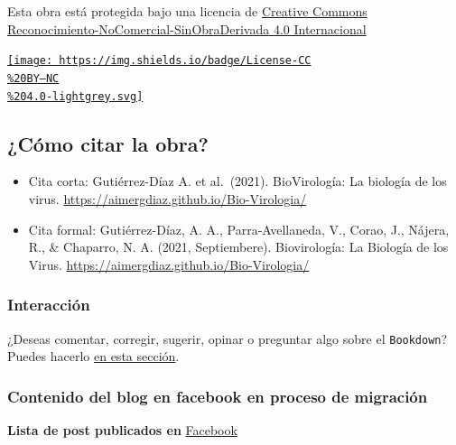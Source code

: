 \documentclass[
  12pt, krantz2,
  spanish,
]{krantz}
\begin{document}
Esta obra está protegida bajo una licencia de \href{https://creativecommons.org/licenses/by-nc-nd/4.0/deed.es_ES}{Creative Commons Reconocimiento-NoComercial-SinObraDerivada 4.0 Internacional}

\href{https://creativecommons.org/licenses/by-nc/4.0/}{\texttt{[image: https://img.shields.io/badge/License-CC\\\%20BY--NC\\\%204.0-lightgrey.svg]}}

\hypertarget{cuxf3mo-citar-la-obra}{%
\subsection*{¿Cómo citar la obra?}\label{cuxf3mo-citar-la-obra}}

\begin{itemize}
\item
  Cita corta:
  Gutiérrez-Díaz A. et al.~(2021). BioVirología: La biología de los virus. \url{https://aimergdiaz.github.io/Bio-Virologia/}
\item
  Cita formal:
  Gutiérrez-Díaz, A. A., Parra-Avellaneda, V., Corao, J., Nájera, R., \& Chaparro, N. A. (2021, Septiembere). Biovirología: La Biología de los Virus. \url{https://aimergdiaz.github.io/Bio-Virologia/}
\end{itemize}

\hypertarget{interacciuxf3n}{%
\subsubsection*{Interacción}\label{interacciuxf3n}}

¿Deseas comentar, corregir, sugerir, opinar o preguntar algo sobre el \texttt{Bookdown}? Puedes hacerlo \href{https://github.com/AimerGDiaz/Bio-Virologia/discussions/10}{en esta sección}.

\hypertarget{contenido-del-blog-en-facebook-en-proceso-de-migraciuxf3n}{%
\subsubsection*{Contenido del blog en facebook en proceso de migración}\label{contenido-del-blog-en-facebook-en-proceso-de-migraciuxf3n}}

\textbf{Lista de post publicados en} \href{https://www.facebook.com/permalink.php?story_fbid=174758050915684\&id=107088044349352}{Facebook}
\end{document}

